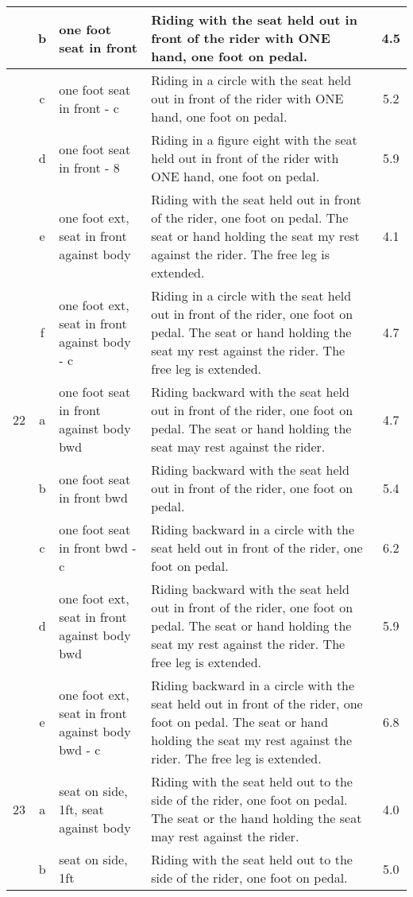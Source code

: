 \begin{longtable}{|r|c|p{4cm}|p{8cm}|c|}
\hline
  & b & one foot seat in front  & Riding with the seat held out in front of the rider with ONE hand, one foot on pedal. & 4.5 \\ 
\hline
  & c & one foot seat in front - c  & Riding in a circle with the seat held out in front of the rider with ONE hand, one foot on pedal. & 5.2 \\ 
\hline
  & d & one foot seat in front - 8  & Riding in a figure eight with the seat held out in front of the rider with ONE hand, one foot on pedal. & 5.9 \\ 
\hline
  & e & one foot ext, seat in front against body  & Riding with the seat held out in front of the rider, one foot on pedal. The seat or hand holding the seat my rest against the rider. The free leg is extended.  & 4.1 \\ 
\hline
  & f & one foot ext, seat in front against body - c  & Riding in a circle with the seat held out in front of the rider, one foot on pedal. The seat or hand holding the seat my rest against the rider. The free leg is extended.  & 4.7 \\ 
\hline
22  & a & one foot seat in front against body bwd & Riding backward with the seat held out in front of the rider, one foot on pedal. The seat or hand holding the seat may rest against the rider.  & 4.7 \\ 
\hline
  & b & one foot seat in front bwd  & Riding backward with the seat held out in front of the rider, one foot on pedal.  & 5.4 \\ 
\hline
  & c & one foot seat in front bwd - c  & Riding backward in a circle with the seat held out in front of the rider, one foot on pedal.  & 6.2 \\ 
\hline
  & d & one foot ext, seat in front against body bwd  & Riding backward with the seat held out in front of the rider, one foot on pedal. The seat or hand holding the seat my rest against the rider. The free leg is extended. & 5.9 \\ 
\hline
  & e & one foot ext, seat in front against body bwd - c  & Riding backward in a circle with the seat held out in front of the rider, one foot on pedal. The seat or hand holding the seat my rest against the rider. The free leg is extended. & 6.8 \\ 
\hline
23  & a & seat on side, 1ft, seat against body  & Riding with the seat held out to the side of the rider, one foot on pedal. The seat or the hand holding the seat may rest against the rider.  & 4.0 \\ 
\hline
  & b & seat on side, 1ft & Riding with the seat held out to the side of the rider, one foot on pedal.  & 5.0 \\ 

\end{longtable}
